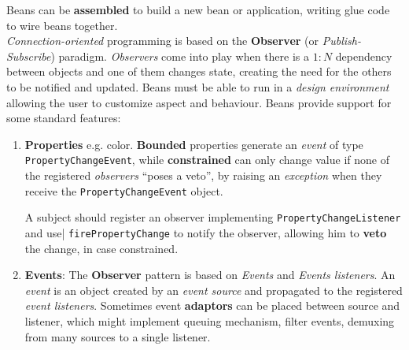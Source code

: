 Beans can be \textbf{assembled} to build a new bean or application, writing glue code to wire beans together.\\
\textit{Connection-oriented} programming is based on the \textbf{Observer} (or \textit{Publish-Subscribe}) paradigm.
\textit{Observers} come into play when there is a $1:N$ dependency between objects and one of them changes state, creating the need for the others to be notified and updated.
Beans must be able to run in a \textit{design environment} allowing the user to customize aspect and behaviour.
Beans provide support for some standard features:
\begin{enumerate}
    \item \textbf{Properties} e.g. color. 
    \textbf{Bounded} properties generate an \textit{event} of type \lstinline{PropertyChangeEvent},
    while \textbf{constrained} can only change value if none of the registered \textit{observers} ``poses a veto'',
    by raising an \textit{exception} when they receive the \lstinline{PropertyChangeEvent} object.

    A subject should register an observer implementing \lstinline|PropertyChangeListener| and use| \lstinline|firePropertyChange| to notify the observer, allowing him to \textbf{veto} the change, in case constrained.
    \item \textbf{Events}: The \textbf{Observer} pattern is based on \textit{Events} and \textit{Events listeners}.
    An \textit{event} is an object created by an \textit{event source} and propagated to the registered \textit{event listeners}.
    Sometimes event \textbf{adaptors} can be placed between source and listener, 
    which might implement queuing mechanism, filter events, demuxing from many sources to a single listener.


\end{enumerate}
